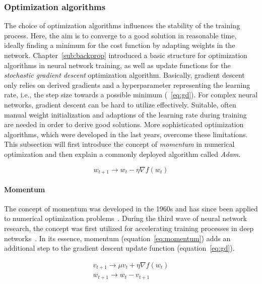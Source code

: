 \subsubsection{Optimization algorithms}
\label{sub:dl_optimization_algos}

The choice of optimization algorithms influences the stability of the training
process.
Here, the aim is to converge to a good solution in reasonable time, ideally
finding a minimum for the cost function by adapting weights in the network.
Chapter~\ref{sub:backprop} introduced a basic structure for optimization
algorithms in neural network training, as well as update functions for the
\textit{stochastic gradient descent} optimization algorithm.
Basically, gradient descent only relies on derived gradients and a hyperparameter
representing the learning rate, i.e., the step size towards a possible minimum
(~\ref{eq:gd}).
For complex neural networks, gradient descent can be hard to utilize effectively.
Suitable, often manual weight initialization and adaptions of the learning rate
during training are needed in order to derive good solutions.
More sophisticated optimization algorithms, which were developed in the last
years, overcome these limitations.
This subsection will first introduce the concept of \textit{momentum} in
numerical optimization and then explain a commonly deployed algorithm called
\textit{Adam}.

\begin{equation}
  \label{eq:gd}
  w_{t+1} \rightarrow w_t - \eta \nabla f(w_t)
\end{equation}

\paragraph{Momentum}

The concept of momentum was developed in the 1960s and has since been applied
to numerical optimization problems~\cite{Polyak1964}.
During the third wave of neural network research, the concept was first
utilized for accelerating training processes in deep networks~\cite{Sutskever2013}.
In its essence, momentum (equation~\ref{eq:momentum}) adds an additional step to 
the gradient descent update function (equation~\ref{eq:gd}).

\begin{align}
  \label{eq:momentum}
  v_{t+1} \rightarrow \mu v_t + \eta \nabla f(w_t) \\
  w_{t+1} \rightarrow w_t - v_{t+1}
\end{align}

